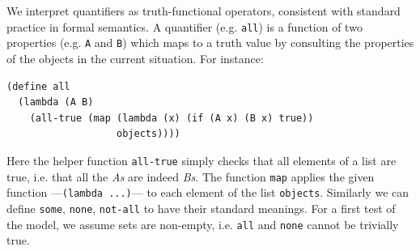 \documentclass[10pt,letterpaper]{article}
\begin{document}
%



%
%



We interpret quantifiers as truth-functional operators, consistent with standard practice in formal semantics.
A quantifier (e.g. \lstinline{all}) is a function of two properties (e.g. \lstinline{A} and \lstinline{B}) which maps to a truth value by consulting the properties of the objects in the current situation. For instance:
\begin{lstlisting}
(define all 
  (lambda (A B) 
    (all-true (map (lambda (x) (if (A x) (B x) true)) 
                   objects))))
\end{lstlisting}
Here the helper function \lstinline{all-true} simply checks that all elements of a list are true, i.e. that all the \emph{As} are indeed \emph{Bs}. The function \lstinline{map} applies the given function ---\lstinline{(lambda ...)}--- to each element of the list \lstinline{objects}. Similarly we can define \lstinline{some}, \lstinline{none}, \lstinline{not-all} to have their standard meanings. For a first test of the model, we assume sets are non-empty, i.e. \lstinline{all} and \lstinline{none} cannot be trivially true.
\end{document}
